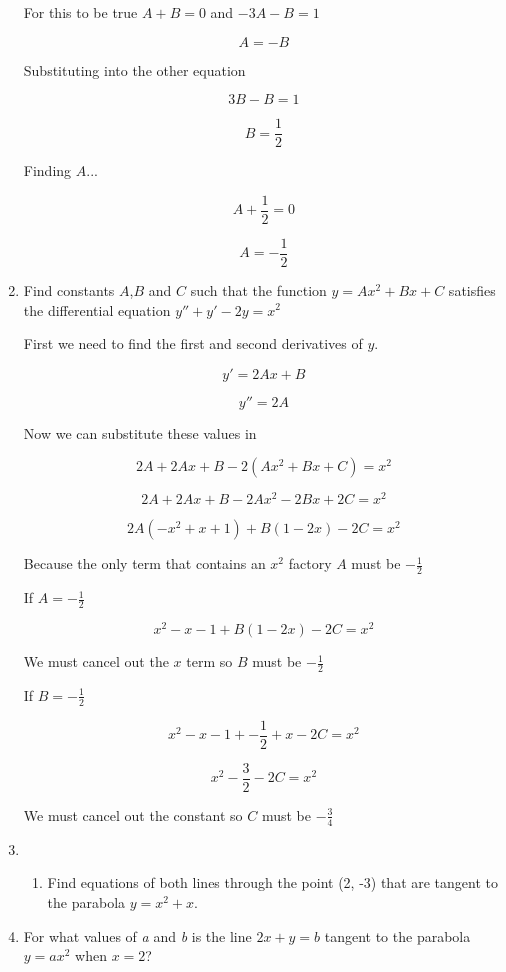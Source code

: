 \documentclass{article}
\begin{document}
\begin{enumerate}
				For this to be true $A+B=0$ and $-3A - B = 1$

				$$A = -B$$

				Substituting into the other equation

				$$3B - B = 1$$

				$$B = \frac{1}{2}$$

				Finding $A$...

				$$A + \frac{1}{2} = 0$$

				$$A = - \frac{1}{2}$$

			\item Find constants $A$,$B$ and $C$ such that the function $y = Ax^2 + Bx + C$ satisfies the
				differential equation $y'' + y' - 2y = x^2$

				First we need to find the first and second derivatives of $y$.

				$$y' = 2Ax + B$$

				$$y'' = 2A$$

				Now we can substitute these values in

				$$2A + 2Ax + B - 2(Ax^2 + Bx + C) = x^2$$

				$$2A + 2Ax + B - 2Ax^2 - 2Bx + 2C = x^2$$

				$$2A(-x^2 + x + 1) + B(1-2x) - 2C = x^2$$

				Because the only term that contains an $x^2$ factory $A$ must be $- \frac{1}{2}$

				If $A = -\frac{1}{2}$

				$$x^2 - x - 1 + B(1-2x) - 2C = x^2$$

				We must cancel out the $x$ term so $B$ must be $-\frac{1}{2}$

				If $B = -\frac{1}{2}$

				$$x^2 - x - 1 + - \frac{1}{2} + x - 2C = x^2$$

				$$x^2 - \frac{3}{2} - 2C = x^2$$

				We must cancel out the constant so $C$ must be $-\frac{3}{4}$


			\item
			\begin{enumerate}
				\item Find equations of both lines through the point (2, -3) that
					are tangent to the parabola $y = x^2 + x$.
			\end{enumerate}	

			\item For what values of \emph{a} and \emph{b} is the line $2x + y = b$
				tangent to the parabola $y = ax^2$ when $x = 2$?


\end{enumerate}
\end{document}
